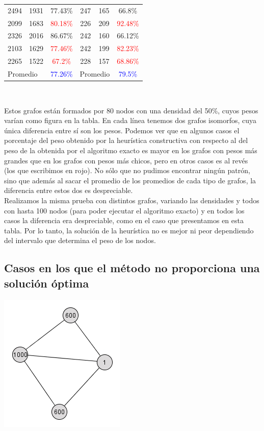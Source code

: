 \documentclass[a4paper, 10pt]{article}
\begin{document}
\begin{center}
\begin{tabular}{|c|c|c|c|c|c|}
2494 & 1931 & 77.43\% & 247 & 165 & 66.8\% \\
2099 & 1683 & \textcolor{red}{80.18\%} & 226 & 209 & \textcolor{red}{92.48\%} \\
2326 & 2016 & 86.67\% & 242 & 160 & 66.12\% \\
2103 & 1629 & \textcolor{red}{77.46\%} & 242 & 199 & \textcolor{red}{82.23\%} \\
2265 & 1522 & \textcolor{red}{67.2\%} & 228 & 157 & \textcolor{red}{68.86\%} \\
\hline
\multicolumn{2}{|l|}{Promedio} & \textcolor{blue}{77.26\%} & \multicolumn{2}{|l|}{Promedio} & \textcolor{blue}{79.5\%} \\
\hline
\end{tabular}
\\
\end{center}

\newpage

Estos grafos est\'an formados por 80 nodos con una densidad del 50\%, cuyos pesos var\'ian como figura en la tabla. En cada l\'inea tenemos dos grafos isomorfos, cuya \'unica diferencia entre s\'i son los pesos. Podemos ver que en algunos casos el porcentaje del peso obtenido por la heur\'istica constructiva con respecto al del peso de la obtenida por el algoritmo exacto es mayor en los grafos con pesos m\'as grandes que en los grafos con pesos m\'as chicos, pero en otros casos es al rev\'es (los que escribimos en rojo). No s\'olo que no pudimos encontrar ning\'un patr\'on, sino que adem\'as al sacar el promedio de los promedios de cada tipo de grafos, la diferencia entre estos dos es despreciable. \\

Realizamos la misma prueba con distintos grafos, variando las densidades y todos con hasta 100 nodos (para poder ejecutar el algoritmo exacto) y en todos los casos la diferencia era despreciable, como en el caso que presentamos en esta tabla. Por lo tanto, la soluci\'on de la heur\'istica no es mejor ni peor dependiendo del intervalo que determina el peso de los nodos. \\

\subsection{Casos en los que el m\'etodo no proporciona una soluci\'on \'optima}

\begin{center}
	\includegraphics[scale=0.50]{Graficos/diamante.jpg}
\end{center}
\end{document}
